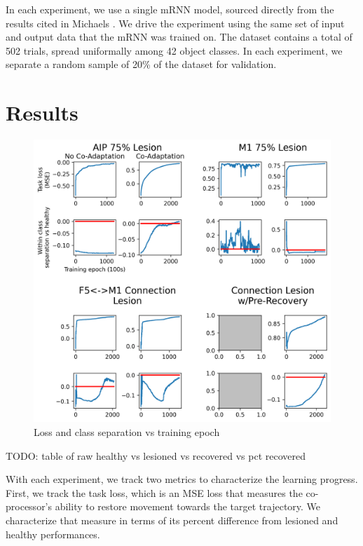 \documentclass[12pt]{iopart}
\begin{document}
In each experiment, we use a single mRNN model, sourced directly from the results
cited in Michaels \cite{michaels.mrnn}. We drive the experiment using the same set of
input and output data that the mRNN was trained on. The dataset contains a total of
502 trials, spread uniformally among 42 object classes. In each experiment, we separate
a random sample of 20\% of the dataset for validation.

\section{Results}
\label{sec:results}

\begin{figure}[h]
\includegraphics[width=\textwidth]{training_results.png}
\caption{Loss and class separation vs training epoch}
\centering
\label{fig:results}
\end{figure}

TODO: table of raw healthy vs lesioned vs recovered vs pct recovered

With each experiment, we track two metrics to characterize the learning progress. First, we
track the task loss, which is an MSE loss that measures the co-processor's ability to restore
movement towards the target trajectory. We characterize that measure in terms of its percent
difference from lesioned and healthy performances.
\end{document}
